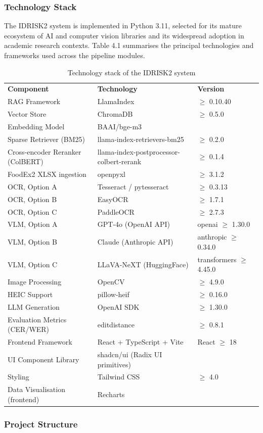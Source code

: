 \hypertarget{technology-stack}{%
\subsubsection{Technology Stack}\label{technology-stack}}

The IDRISK2 system is implemented in Python 3.11, selected for its mature ecosystem of AI and computer vision libraries and its widespread adoption in academic research contexts. Table 4.1 summarises the principal technologies and frameworks used across the pipeline modules.

\begin{longtable}[]{@{}lll@{}}
\caption{Technology stack of the IDRISK2 system}\label{tab:tech-stack}\\
\toprule
\endhead
\textbf{Component} & \textbf{Technology} & \textbf{Version}\tabularnewline
RAG Framework & LlamaIndex & \(\ge\) 0.10.40\tabularnewline
Vector Store & ChromaDB & \(\ge\) 0.5.0\tabularnewline
Embedding Model & BAAI/bge-m3 &\tabularnewline
Sparse Retriever (BM25) & llama-index-retrievers-bm25 & \(\ge\) 0.2.0\tabularnewline
Cross-encoder Reranker (ColBERT) & llama-index-postprocessor-colbert-rerank & \(\ge\) 0.1.4\tabularnewline
FoodEx2 XLSX ingestion & openpyxl & \(\ge\) 3.1.2\tabularnewline
OCR, Option A & Tesseract / pytesseract & \(\ge\) 0.3.13\tabularnewline
OCR, Option B & EasyOCR & \(\ge\) 1.7.1\tabularnewline
OCR, Option C & PaddleOCR & \(\ge\) 2.7.3\tabularnewline
VLM, Option A & GPT-4o (OpenAI API) & openai \(\ge\) 1.30.0\tabularnewline
VLM, Option B & Claude (Anthropic API) & anthropic \(\ge\) 0.34.0\tabularnewline
VLM, Option C & LLaVA-NeXT (HuggingFace) & transformers \(\ge\) 4.45.0\tabularnewline
Image Processing & OpenCV & \(\ge\) 4.9.0\tabularnewline
HEIC Support & pillow-heif & \(\ge\) 0.16.0\tabularnewline
LLM Generation & OpenAI SDK & \(\ge\) 1.30.0\tabularnewline
Evaluation Metrics (CER/WER) & editdistance & \(\ge\) 0.8.1\tabularnewline
Frontend Framework & React + TypeScript + Vite & React \(\ge\) 18\tabularnewline
UI Component Library & shadcn/ui (Radix UI primitives) &\tabularnewline
Styling & Tailwind CSS & \(\ge\) 4.0\tabularnewline
Data Visualisation (frontend) & Recharts &\tabularnewline
\bottomrule
\end{longtable}


\hypertarget{project-structure}{%
\subsubsection{Project Structure}\label{project-structure}}

